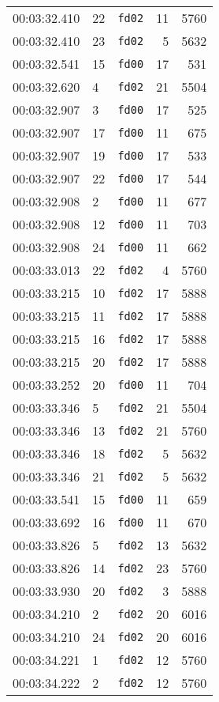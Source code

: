 \documentclass{article}
\begin{document}
\begin{longtable}{lllrr}
00:03:32.410 & 22 & \texttt{fd02} & 11 & 5760 \\
00:03:32.410 & 23 & \texttt{fd02} & 5 & 5632 \\
00:03:32.541 & 15 & \texttt{fd00} & 17 & 531 \\
00:03:32.620 & 4 & \texttt{fd02} & 21 & 5504 \\
00:03:32.907 & 3 & \texttt{fd00} & 17 & 525 \\
00:03:32.907 & 17 & \texttt{fd00} & 11 & 675 \\
00:03:32.907 & 19 & \texttt{fd00} & 17 & 533 \\
00:03:32.907 & 22 & \texttt{fd00} & 17 & 544 \\
00:03:32.908 & 2 & \texttt{fd00} & 11 & 677 \\
00:03:32.908 & 12 & \texttt{fd00} & 11 & 703 \\
00:03:32.908 & 24 & \texttt{fd00} & 11 & 662 \\
00:03:33.013 & 22 & \texttt{fd02} & 4 & 5760 \\
00:03:33.215 & 10 & \texttt{fd02} & 17 & 5888 \\
00:03:33.215 & 11 & \texttt{fd02} & 17 & 5888 \\
00:03:33.215 & 16 & \texttt{fd02} & 17 & 5888 \\
00:03:33.215 & 20 & \texttt{fd02} & 17 & 5888 \\
00:03:33.252 & 20 & \texttt{fd00} & 11 & 704 \\
00:03:33.346 & 5 & \texttt{fd02} & 21 & 5504 \\
00:03:33.346 & 13 & \texttt{fd02} & 21 & 5760 \\
00:03:33.346 & 18 & \texttt{fd02} & 5 & 5632 \\
00:03:33.346 & 21 & \texttt{fd02} & 5 & 5632 \\
00:03:33.541 & 15 & \texttt{fd00} & 11 & 659 \\
00:03:33.692 & 16 & \texttt{fd00} & 11 & 670 \\
00:03:33.826 & 5 & \texttt{fd02} & 13 & 5632 \\
00:03:33.826 & 14 & \texttt{fd02} & 23 & 5760 \\
00:03:33.930 & 20 & \texttt{fd02} & 3 & 5888 \\
00:03:34.210 & 2 & \texttt{fd02} & 20 & 6016 \\
00:03:34.210 & 24 & \texttt{fd02} & 20 & 6016 \\
00:03:34.221 & 1 & \texttt{fd02} & 12 & 5760 \\
00:03:34.222 & 2 & \texttt{fd02} & 12 & 5760 \\

\end{longtable}
\end{document}
